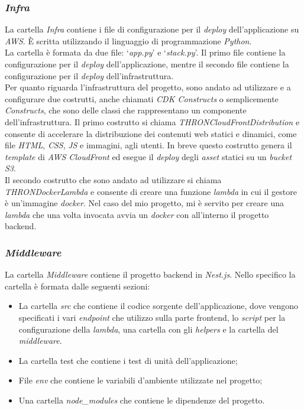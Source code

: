\subsubsection*{\emph{Infra}}
La cartella \textit{Infra} contiene i file di configurazione per il \textit{deploy} dell'applicazione su \textit{AWS}. È scritta utilizzando il linguaggio di programmazione \textit{Python}.\\
La cartella è formata da due file: `\textit{app.py}' e `\textit{stack.py}'. Il primo file contiene la configurazione per il \textit{deploy} dell'applicazione, mentre il secondo file contiene la configurazione per il \textit{deploy} dell'infrastruttura.\\
Per quanto riguarda l'infrastruttura del progetto, sono andato ad utilizzare e a configurare due costrutti, anche chiamati \textit{CDK Constructs} o semplicemente \textit{Constructs}, che sono delle classi che rappresentano un componente dell'infrastruttura.
Il primo costrutto si chiama \textit{THRONCloudFrontDistribution} e consente di accelerare la distribuzione dei contenuti web statici e dinamici, come file \textit{HTML}, \textit{CSS}, \textit{JS} e immagini, agli utenti.
In breve questo costrutto genera il \textit{template} di \textit{AWS CloudFront} ed esegue il \textit{deploy} degli \textit{asset} statici su un \textit{bucket S3}.\\
Il secondo costrutto che sono andato ad utilizzare si chiama \textit{THRONDockerLambda} e consente di creare una funzione \textit{lambda} in cui il gestore è un'immagine \textit{docker}.
Nel caso del mio progetto, mi è servito per creare una \textit{lambda} che una volta invocata avvia un \textit{docker} con all'interno il progetto backend.\\

\subsubsection*{\emph{Middleware}}
La cartella \textit{Middleware} contiene il progetto backend in \textit{Nest.js}. Nello specifico la cartella è formata dalle seguenti sezioni:
\begin{itemize}
  \item La cartella \textit{src} che contiene il codice sorgente dell'applicazione, dove vengono specificati i vari \textit{endpoint} che utilizzo sulla parte frontend, lo \textit{script} per la configurazione
  della \textit{lambda}, una cartella con gli \textit{helpers} e la cartella del \textit{middleware}.
  \item La cartella test che contiene i test di unità dell'applicazione;
  \item File \textit{env} che contiene le variabili d'ambiente utilizzate nel progetto;
  \item Una cartella \textit{node\_modules} che contiene le dipendenze del progetto.
\end{itemize}
